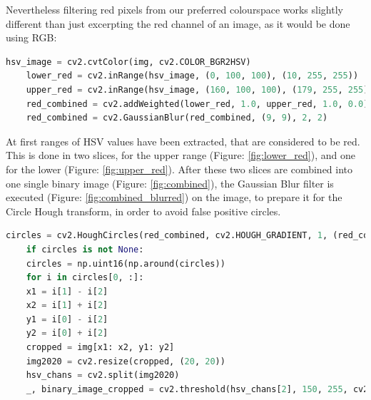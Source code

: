 Nevertheless filtering red pixels from our preferred colourspace works slightly different than just excerpting the red channel of an image, as it would be done using RGB:


\lstset{style=custompy}
\begin{minipage}{0.95\linewidth}
	\begin{lstlisting}[language=python,  caption={Preprocessing image before HoughCircles}, label={lst:prehough},captionpos=b]
	hsv_image = cv2.cvtColor(img, cv2.COLOR_BGR2HSV)
	lower_red = cv2.inRange(hsv_image, (0, 100, 100), (10, 255, 255))
	upper_red = cv2.inRange(hsv_image, (160, 100, 100), (179, 255, 255))
	red_combined = cv2.addWeighted(lower_red, 1.0, upper_red, 1.0, 0.0)
	red_combined = cv2.GaussianBlur(red_combined, (9, 9), 2, 2)
	\end{lstlisting}
\end{minipage}

At first ranges of HSV values have been extracted, that are considered to be red. This is done in two slices, for the upper range (Figure: \ref{fig:lower_red}), and one for the lower (Figure: \ref{fig:upper_red}). After these two slices are combined into one single binary image (Figure: \ref{fig:combined}), the Gaussian Blur filter is executed (Figure: \ref{fig:combined_blurred}) on the image, to prepare it for the Circle Hough transform, in order to avoid false positive circles.\newline


\begin{minipage}{0.95\linewidth}
	\begin{lstlisting}[language=python, caption={Running Circle Hough Transform and extracting circles}, label={lst:hough},captionpos=b]
	circles = cv2.HoughCircles(red_combined, cv2.HOUGH_GRADIENT, 1, (red_combined.shape[0]) / 2, param1=100, param2=20, minRadius=10, maxRadius=0)
	if circles is not None:
	circles = np.uint16(np.around(circles))
	for i in circles[0, :]:
	x1 = i[1] - i[2]
	x2 = i[1] + i[2]
	y1 = i[0] - i[2]
	y2 = i[0] + i[2]
	cropped = img[x1: x2, y1: y2]
	img2020 = cv2.resize(cropped, (20, 20))
	hsv_chans = cv2.split(img2020)
	_, binary_image_cropped = cv2.threshold(hsv_chans[2], 150, 255, cv2.THRESH_BINARY)
	\end{lstlisting}
\end{minipage}

